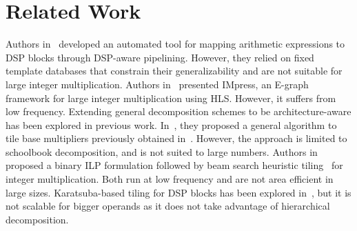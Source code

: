 \documentclass[conference]{IEEEtran}
\begin{document}
\section{Related Work}
Authors in~\cite{fahmyMapDSPMaxPerformance2016} developed an automated tool for mapping arithmetic expressions to DSP blocks through DSP-aware pipelining.
However, they relied on fixed template databases that constrain their generalizability and are not suitable for large integer multiplication. 
Authors in~\cite{zhangIMpressLargeInteger2022} presented IMpress, an E-graph framework for large integer multiplication using HLS.
However, it suffers from low frequency.
Extending general decomposition schemes to be architecture-aware has been explored in previous work. 
In~\cite{royTileMultiplicationEfficient2014}, they proposed a general algorithm to tile base multipliers previously obtained in~\cite{pascaLargeMultipliersLessDSP2009}.
However, the approach is limited to schoolbook decomposition, and is not suited to large numbers.
Authors in~\cite{kummTilingILP2017} proposed a binary ILP formulation followed by beam search heuristic tiling~\cite{kummTilingHeuristics2020} for integer multiplication.
Both run at low frequency and are not area efficient in large sizes.
Karatsuba-based tiling for DSP blocks has been explored in~\cite{kummKaratsubaRectangularMultipliers2018}, but it is not scalable for bigger operands as it does not take advantage of hierarchical decomposition.









% 


\end{document}
